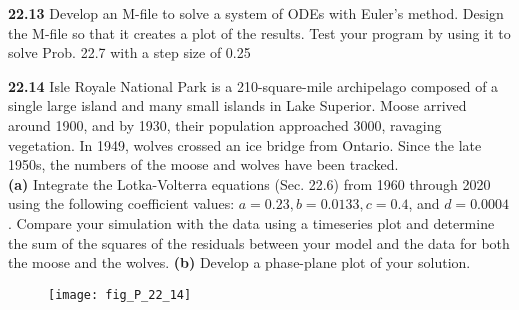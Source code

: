 \begin{multicols}{2}
    \noindent\textbf{22.13} Develop an M-file to solve a system of ODEs with
    Euler's method. Design the M-file so that it creates a plot of
    the results. Test your program by using it to solve Prob. 22.7
    with a step size of 0.25\vspace{2mm}

    \noindent\textbf{22.14} Isle Royale National Park is a 210-square-mile archipelago composed of a single large island and many small
    islands in Lake Superior. Moose arrived around 1900, and
    by 1930, their population approached 3000, ravaging vegetation. In 1949, wolves crossed an ice bridge from Ontario.
    Since the late 1950s, the numbers of the moose and wolves
    have been tracked.\\
    \textbf{(a)} Integrate the Lotka-Volterra equations (Sec. 22.6) from 1960 through 2020 using the following coefficient values: $a=0.23, b=0.0133, c=0.4$, and $d=0.0004$. Compare your simulation with the data using a timeseries plot and determine the sum of the squares of the residuals between your model and the data for both the moose and the wolves.
    \textbf{(b)} Develop a phase-plane plot of your solution.\vspace{2mm}

    \end{multicols}

    \begin{figure}[H]
        \centering
        \texttt{[image: fig\_P\_22\_14]}
    \end{figure}

